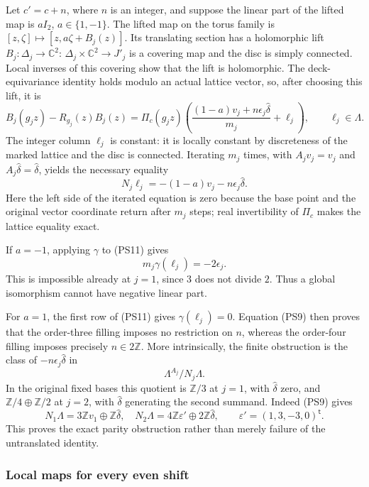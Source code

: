 Let $c'=c+n$, where $n$ is an integer, and suppose the linear part of
the lifted map is $aI_2$, $a\in\{1,-1\}$. The lifted map on the torus
family is $[z,\zeta]\mapsto[z,a\zeta+B_j(z)]$. Its translating
section has a holomorphic lift $B_j:\Delta_j\to\mathbb C^2$:
$\Delta_j\times\mathbb C^2\to J'_j$ is a covering map and the disc is
simply connected. Local inverses of this covering show that the lift
is holomorphic. The deck-equivariance identity holds modulo an
actual lattice vector, so, after choosing this lift, it is
\[
 B_j(g_jz)-R_{g_j}(z)B_j(z)
  =\Pi_c(g_jz)\left(
       \frac{(1-a)v_j+n\epsilon_j\widehat\delta}{m_j}
          +\ell_j\right),\qquad \ell_j\in\Lambda.
 \tag{PS10}\label{pshift:eq:finite-equation}
\]
The integer column $\ell_j$ is constant: it is locally constant by
discreteness of the marked lattice and the disc is connected.
Iterating $m_j$ times, with $A_jv_j=v_j$ and
$A_j\widehat\delta=\widehat\delta$, yields the necessary equality
\[
 N_j\ell_j=-(1-a)v_j-n\epsilon_j\widehat\delta.
 \tag{PS11}\label{pshift:eq:finite-norm-obstruction}
\]
Here the left side of the iterated equation is zero because the
base point and the original vector coordinate return after $m_j$
steps; real invertibility of $\Pi_c$ makes the lattice equality exact.

If $a=-1$, applying $\gamma$ to (PS11) gives
\[
                   m_j\gamma(\ell_j)=-2\epsilon_j.
\]
This is impossible already at $j=1$, since $3$ does not divide $2$.
Thus a global isomorphism cannot have negative linear part.

For $a=1$, the first row of (PS11) gives $\gamma(\ell_j)=0$.
Equation (PS9) then proves that the order-three filling imposes no
restriction on $n$, whereas the order-four filling imposes precisely
$n\in2\mathbb Z$. More intrinsically, the finite obstruction is the
class of $-n\epsilon_j\widehat\delta$ in
\[
 \Lambda^{A_j}/N_j\Lambda.
 \tag{PS12}\label{pshift:eq:finite-class}
\]
In the original fixed bases this quotient is
$\mathbb Z/3$ at $j=1$, with $\widehat\delta$ zero, and
$\mathbb Z/4\oplus\mathbb Z/2$ at $j=2$, with
$\widehat\delta$ generating the second summand. Indeed (PS9) gives
\[
 N_1\Lambda=3\mathbb Z v_1\oplus\mathbb Z\widehat\delta,
 \quad
 N_2\Lambda=4\mathbb Z\varepsilon'\oplus
                      2\mathbb Z\widehat\delta,
 \qquad \varepsilon'=(1,3,-3,0)^{\mathsf t}.
\]
This proves the exact parity obstruction rather than merely failure
of the untranslated identity.

\subsubsection{Local maps for every even shift}

